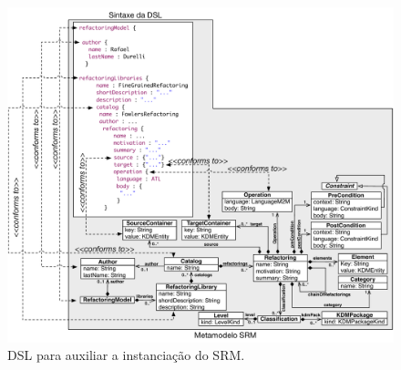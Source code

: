 
\begin{figure}[!h]
	\centering
	\caption{DSL para auxiliar a instanciação do SRM.}
	\label{fig:DSL_SRM}
	\includegraphics[scale=0.58]{images/MetaModelEDSL3}
	\fautor
\end{figure}

